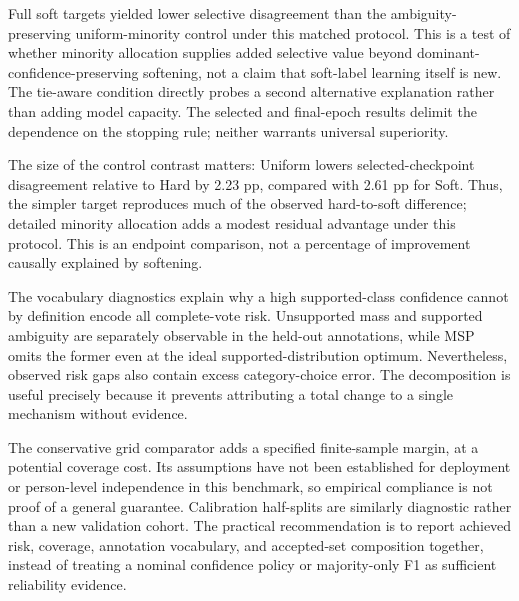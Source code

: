 Full soft targets yielded lower selective disagreement than the ambiguity-preserving uniform-minority control under this matched protocol. This is a test of whether minority allocation supplies added selective value beyond dominant-confidence-preserving softening, not a claim that soft-label learning itself is new. The tie-aware condition directly probes a second alternative explanation rather than adding model capacity. The selected and final-epoch results delimit the dependence on the stopping rule; neither warrants universal superiority.

The size of the control contrast matters: Uniform lowers selected-checkpoint disagreement relative to Hard by 2.23 pp, compared with 2.61 pp for Soft. Thus, the simpler target reproduces much of the observed hard-to-soft difference; detailed minority allocation adds a modest residual advantage under this protocol. This is an endpoint comparison, not a percentage of improvement causally explained by softening.

The vocabulary diagnostics explain why a high supported-class confidence cannot by definition encode all complete-vote risk. Unsupported mass and supported ambiguity are separately observable in the held-out annotations, while MSP omits the former even at the ideal supported-distribution optimum. Nevertheless, observed risk gaps also contain excess category-choice error. The decomposition is useful precisely because it prevents attributing a total change to a single mechanism without evidence.

The conservative grid comparator adds a specified finite-sample margin, at a potential coverage cost. Its assumptions have not been established for deployment or person-level independence in this benchmark, so empirical compliance is not proof of a general guarantee. Calibration half-splits are similarly diagnostic rather than a new validation cohort. The practical recommendation is to report achieved risk, coverage, annotation vocabulary, and accepted-set composition together, instead of treating a nominal confidence policy or majority-only F1 as sufficient reliability evidence.

